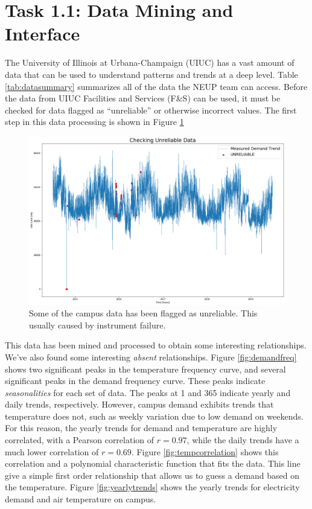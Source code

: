 \section{Task 1.1: Data Mining and Interface}

The University of Illinois at Urbana-Champaign (UIUC) has a vast amount of
data that can be used to understand patterns and trends at a deep level. Table \ref{tab:datasummary} summarizes all of the data the NEUP team can access.
Before the data from UIUC Facilities and Services (F\&S) can be used, it must
be checked for data flagged as ``unreliable'' or otherwise incorrect values.
The first step in this data processing is shown in Figure \ref{fig:unreliable}
\begin{figure}
  \centering
  \includegraphics[width=\textwidth]{unreliable}
  \caption{Some of the campus data has been flagged as unreliable. This usually caused by instrument failure.}
  \label{fig:unreliable}
\end{figure}
This data has been mined and processed to obtain some interesting relationships.
We've also found some interesting \textit{absent} relationships. Figure \ref{fig:demandfreq} shows two significant peaks in the temperature frequency
curve, and several significant peaks in the demand frequency curve. These peaks
indicate \textit{seasonalities} for each set of data. The peaks at 1 and 365
indicate yearly and daily trends, respectively. However, campus demand exhibits
trends that temperature does not, such as weekly variation due to low demand
on weekends. For this reason, the yearly trends for demand and temperature are
highly correlated, with a Pearson correlation of $r=0.97$, while the daily trends have a much lower correlation of $r=0.69$. Figure \ref{fig:tempcorrelation} shows this correlation and a polynomial characteristic
function that fits the data. This line give a simple first order relationship
that allows us to guess a demand based on the temperature. Figure
\ref{fig:yearlytrends} shows the yearly trends for electricity demand and air
temperature on campus.


